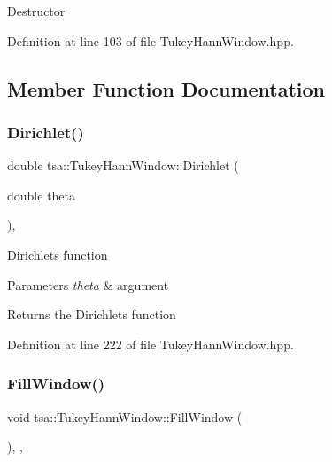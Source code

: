 Destructor 

Definition at line 103 of file Tukey\+Hann\+Window.\+hpp.



\subsection{Member Function Documentation}
\mbox{\label{classtsa_1_1_tukey_hann_window_a6d97dd74ecf13fce86fc5a9349cbd598}} 
\subsubsection{\texorpdfstring{Dirichlet()}{Dirichlet()}}
{\footnotesize\ttfamily double tsa\+::\+Tukey\+Hann\+Window\+::\+Dirichlet (\begin{DoxyParamCaption}\item[{double}]{theta }\end{DoxyParamCaption})\hspace{0.3cm}{\ttfamily [inline]}, {\ttfamily [private]}}

Dirichlet\textquotesingle{}s function


\begin{DoxyParams}{Parameters}
{\em theta} & argument\\
\hline
\end{DoxyParams}
\begin{DoxyReturn}{Returns}
the Dirichlet\textquotesingle{}s function 
\end{DoxyReturn}


Definition at line 222 of file Tukey\+Hann\+Window.\+hpp.

\mbox{\label{classtsa_1_1_tukey_hann_window_a041a98810aa841fd88d19139bf0e977f}} 
\subsubsection{\texorpdfstring{Fill\+Window()}{FillWindow()}}
{\footnotesize\ttfamily void tsa\+::\+Tukey\+Hann\+Window\+::\+Fill\+Window (\begin{DoxyParamCaption}{ }\end{DoxyParamCaption})\hspace{0.3cm}{\ttfamily [inline]}, {\ttfamily [private]}, {\ttfamily [virtual]}}

